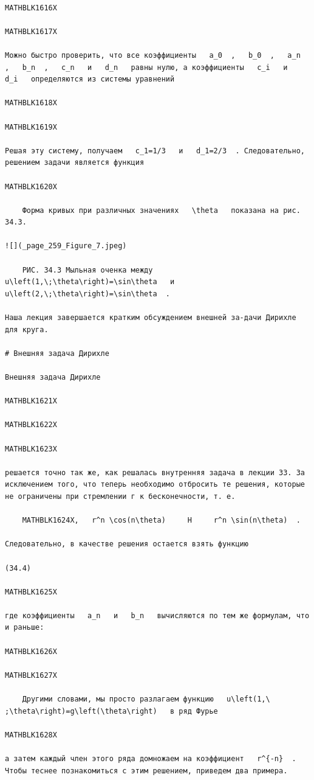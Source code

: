 \documentclass[
]{article}
\begin{document}
\begin{verbatim}

MATHBLK1616X

MATHBLK1617X

Можно быстро проверить, что все коэффициенты   a_0  ,   b_0  ,   a_n  ,   b_n  ,   c_n   и   d_n   равны нулю, а коэффициенты   c_i   и   d_i   определяются из системы уравнений

MATHBLK1618X

MATHBLK1619X

Решая эту систему, получаем   c_1=1/3   и   d_1=2/3  . Следовательно, решением задачи является функция

MATHBLK1620X

    Форма кривых при различных значениях   \theta   показана на рис. 34.3.

![](_page_259_Figure_7.jpeg)

    РИС. 34.3 Мыльная оченка между   u\left(1,\;\theta\right)=\sin\theta   и   u\left(2,\;\theta\right)=\sin\theta  .

Наша лекция завершается кратким обсуждением внешней за-дачи Дирихле для круга.

# Внешняя задача Дирихле

Внешняя задача Дирихле

MATHBLK1621X

MATHBLK1622X

MATHBLK1623X

решается точно так же, как решалась внутренняя задача в лекции 33. За исключением того, что теперь необходимо отбросить те решения, которые не ограничены при стремлении г к бесконечности, т. е.

    MATHBLK1624X,   r^n \cos(n\theta)     H     r^n \sin(n\theta)  .

Следовательно, в качестве решения остается взять функцию

(34.4)

MATHBLK1625X

где коэффициенты   a_n   и   b_n   вычисляются по тем же формулам, что и раньше:

MATHBLK1626X

MATHBLK1627X

    Другими словами, мы просто разлагаем функцию   u\left(1,\ ;\theta\right)=g\left(\theta\right)   в ряд Фурье

MATHBLK1628X

а затем каждый член этого ряда домножаем на коэффициент   r^{-n}  . Чтобы теснее познакомиться с этим решением, приведем два примера.


\end{verbatim}
\end{document}
